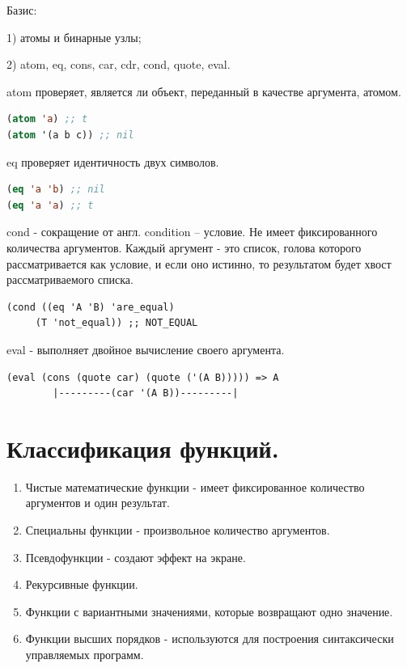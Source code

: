 Базис:

1) атомы и бинарные узлы;

2) atom, eq, cons, car, cdr, cond, quote, eval.

atom проверяет, является ли объект, переданный в качестве аргумента, атомом.

\begin{lstlisting}[language=Lisp]
(atom 'a) ;; t
(atom '(a b c)) ;; nil
\end{lstlisting}

eq проверяет идентичность двух символов.
\begin{lstlisting}[language=Lisp]
(eq 'a 'b) ;; nil
(eq 'a 'a) ;; t
\end{lstlisting}
	
cond - сокращение от англ. condition – условие. 
Не имеет фиксированного количества аргументов.
Каждый аргумент - это список, голова которого рассматривается как условие, 
и если оно истинно, то результатом будет хвост рассматриваемого списка.

\begin{lstlisting}
(cond ((eq 'A 'B) 'are_equal)
	 (T 'not_equal)) ;; NOT_EQUAL
\end{lstlisting}

eval - выполняет двойное вычисление своего аргумента.

\begin{lstlisting}
(eval (cons (quote car) (quote ('(A B))))) => A
		|---------(car '(A B))---------|

\end{lstlisting}


\section{Классификация функций.}

\begin{enumerate}
	\item Чистые математические функции - имеет фиксированное количество аргументов и один результат.
	\item Специальны функции - произвольное количество аргументов.
	\item Псевдофункции - создают эффект на экране.
	\item Рекурсивные функции.
	\item Функции с вариантными значениями, которые возвращают одно значение.
	\item Функции высших порядков - используются для построения синтаксически управляемых программ. %
\end{enumerate}

